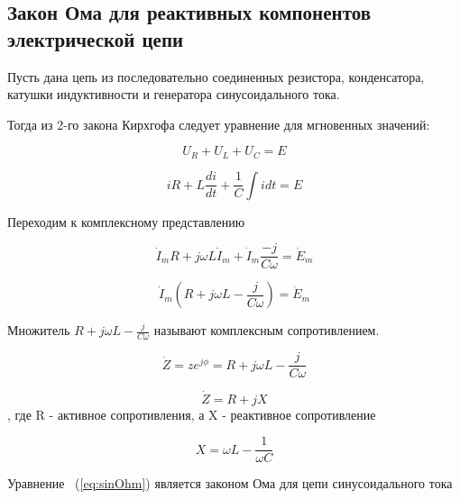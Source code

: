\subsection{Закон Ома для реактивных компонентов электрической цепи}

Пусть дана цепь из последовательно соединенных резистора, конденсатора, катушки индуктивности и генератора синусоидального тока.

Тогда из 2-го закона Кирхгофа следует уравнение для мгновенных значений:

\begin{equation}
U_R+U_L+U_C=E
\end{equation}

\begin{equation}
i R + L \frac{d i}{d t}+\frac{1}{C} \int i d t = E
\end{equation}


Переходим к комплексному представлению


\begin{equation}
\dot I_m R + j \omega L \dot I_m +\dot I_m \frac{-j}{C \omega} = \dot E_m 
\end{equation}

\begin{equation}\label{eq:sinOhm}
\dot I_m (R + j \omega L - \frac{j}{C \omega}) = \dot E_m 
\end{equation}

Множитель $R + j \omega L - \frac{j}{C \omega}$ называют комплексным сопротивлением.

\begin{equation}
\dot Z = z e^{j \phi} = R + j \omega L - \frac{j}{C \omega}
\end{equation}


\begin{equation}
\dot Z = R + j X
\end{equation}
, где R - активное сопротивления, а X - реактивное сопротивление

\begin{equation}
X = \omega L - \frac{1}{\omega C}
\end{equation}

Уравнение ~(\ref{eq:sinOhm}) является законом Ома для цепи синусоидального тока

\pagebreak